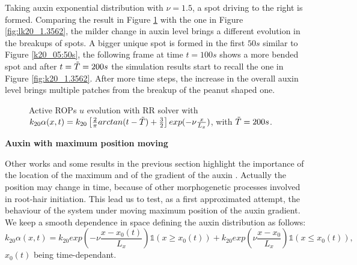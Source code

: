  Taking auxin exponential distribution with $\nu = 1.5$, a spot driving to the right is formed. Comparing the result in Figure \ref{fig:NHarctan} with the one in Figure \ref{fig:lk20_1.3562}, the milder change in auxin level brings a different evolution in the breakups of spots. A bigger unique spot is formed in the first $50 s$ similar to Figure \ref{k20_05:50s}, the following frame at time $t = 100s$ shows a more bended spot and after $t = \Tilde{T} = 200s$ the simulation results start to recall the one in Figure \ref{fig:k20_1.3562}. After more time steps, the increase in the overall auxin level brings multiple patches from the breakup of the peanut shaped one.
\begin{figure}[H]
     \centering
     \quad
     \quad
     \quad
     \quad
     \quad
     \quad
     \quad
     \quad
     \caption[Time dependent prm homogeneous auxin - $k_{20} ~ arctan(x,t)$]{Active ROPs $u$ evolution with RR solver with $k_{20} \alpha(x,t) = k_{20} \left[\frac{2}{\pi} arctan(t - \Tilde{T}) + \frac{3}{2}\right] exp(- \nu \frac{x}{L_x})$, with $\Tilde{T} = 200s$.}
     \label{fig:NHarctan}
 \end{figure}

 \textbf{Auxin with maximum position moving}

Other works and some results in the previous section highlight the importance of the location of the maximum and of the gradient of the auxin \cite{article:Veronica, intra2}. Actually the position may change in time, because of other morphogenetic processes involved in root-hair initiation. This lead us to test, as a first approximated attempt, the behaviour of the system under moving maximum position of the auxin gradient. We keep a smooth dependence in space defining the auxin distribution as follows:
\begin{equation*}
  k_{20} \alpha(x,t) = k_{20} exp\left( -\nu \frac{x-x_0(t)}{L_x}\right) \mathbb{1}\left(x \geq x_0(t)\right) + k_{20} exp\left(\nu \frac{x-x_0}{L_x} \right) \mathbb{1}(x\leq x_0(t)),
\end{equation*}
$x_0(t)$ being time-dependant.

